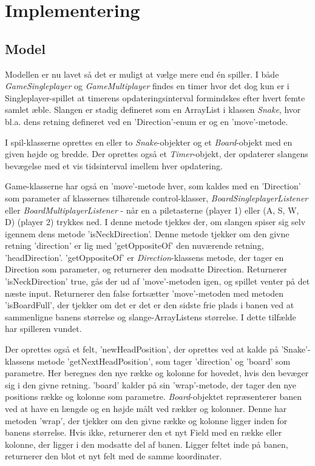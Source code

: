 
\section{Implementering}
\subsection{Model}
Modellen er nu lavet så det er muligt at vælge mere end én spiller. I både \textit{GameSingleplayer} og \textit{GameMultiplayer} findes en timer hvor det dog kun er i Singleplayer-spillet at timerens opdateringsinterval formindskes efter hvert femte samlet æble. Slangen er stadig defineret som en ArrayList i klassen \textit{Snake}, hvor bl.a. dens retning defineret ved en 'Direction'-enum er og en 'move'-metode. 
\linebreak

I spil-klasserne oprettes en eller to \textit{Snake}-objekter og et \textit{Board}-objekt med en given højde og bredde. Der oprettes også et \textit{Timer}-objekt, der opdaterer slangens bevægelse med et vis tidsinterval imellem hver opdatering.  
\linebreak

Game-klasserne har også en 'move'-metode hver, som kaldes med en 'Direction' som parameter af klassernes tilhørende control-klasser, \textit{BoardSingleplayerListener} eller \textit{BoardMultiplayerListener} - når en a piletasterne (player 1) eller (A, S, W, D) (player 2) trykkes ned. I denne metode tjekkes der, om slangen spiser sig selv igennem dens metode 'isNeckDirection'. Denne metode tjekker om den givne retning 'direction' er lig med 'getOppositeOf' den nuværende retning, 'headDirection'. 'getOppositeOf' er \textit{Direction}-klassens metode, der tager en Direction som parameter, og returnerer den modsatte Direction. Returnerer 'isNeckDirection' true, gås der ud af 'move'-metoden igen, og spillet venter på det næste input. Returnerer den false fortsætter 'move'-metoden med metoden 'isBoardFull', der tjekker om det er det er den sidste frie plads i banen ved at sammenligne banens størrelse og slange-ArrayListens størrelse. I dette tilfælde har spilleren vundet.
\linebreak

Der oprettes også et felt, 'newHeadPosition', der oprettes ved at kalde på 'Snake'-klassens metode 'getNextHeadPosition', som tager 'direction' og 'board' som parametre. Her beregnes den nye række og kolonne for hovedet, hvis den bevæger sig i den givne retning. 'board' kalder på sin 'wrap'-metode, der tager den nye positions række og kolonne som parametre. \textit{Board}-objektet repræsenterer banen ved at have en længde og en højde målt ved rækker og kolonner. Denne har metoden 'wrap', der tjekker om den givne række og kolonne ligger inden for banens størrelse. Hvis ikke, returnerer den et nyt Field med en række eller kolonne, der ligger i den modsatte del af banen. Ligger feltet inde på banen, returnerer den blot et nyt felt med de samme koordinater.
\linebreak


